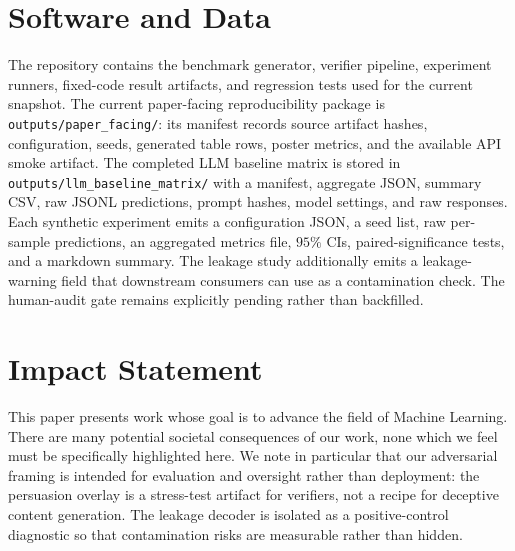 \documentclass{article}
\theoremstyle{plain}
\theoremstyle{definition}
\theoremstyle{remark}
\begin{document}
\section*{Software and Data}
The repository contains the benchmark generator, verifier pipeline, experiment
runners, fixed-code result artifacts, and regression tests used for the current
snapshot. The current paper-facing reproducibility package is
\texttt{outputs/paper\_facing/}: its manifest records source artifact hashes,
configuration, seeds, generated table rows, poster metrics, and the available
API smoke artifact. The completed LLM baseline matrix is stored in
\texttt{outputs/llm\_baseline\_matrix/} with a manifest, aggregate JSON,
summary CSV, raw JSONL predictions, prompt hashes, model settings, and raw
responses. Each synthetic experiment emits a configuration JSON, a seed list,
raw per-sample predictions, an aggregated metrics file, $95\%$ CIs,
paired-significance tests, and a markdown summary. The leakage study
additionally emits a leakage-warning field that downstream consumers can use
as a contamination check. The human-audit gate remains explicitly pending
rather than backfilled.

\section*{Impact Statement}
This paper presents work whose goal is to advance the field of Machine
Learning. There are many potential societal consequences of our work, none
which we feel must be specifically highlighted here. We note in particular
that our adversarial framing is intended for evaluation and oversight rather
than deployment: the persuasion overlay is a stress-test artifact for
verifiers, not a recipe for deceptive content generation. The leakage decoder
is isolated as a positive-control diagnostic so that contamination risks are
measurable rather than hidden.

\nocite{pearl2009causality,pearl2018book,bareinboim2022pearl}
\nocite{jin2023cladder,jin2024corr2cause,frohberg2022crass}
\nocite{geifman2017selective,geifman2019selectivenet}
\nocite{sharma2024sycophancy,chen2024judge,ye2024justice}
\nocite{irving2018debate,bowman2022measuring}
\nocite{guo2017calibration,wen2025abstention}
\nocite{tian2000probabilities,sharma2020dowhy,imbens1994late,shpitser2008complete}
\nocite{zeng2024johnny,lanham2023measuring}
\nocite{si2024checkwhy,sawarni2026causalreasoningbenchmark,deyoung2020evidenceinference}
\nocite{zhou2025evidenceoutcomes,acic2019,neal2021realcause,criteo2014uplift}
\nocite{gao2022kuairec,gao2022kuairand,saito2021openbandit,wadden2020scifact,sarrouti2021healthver}
\end{document}
